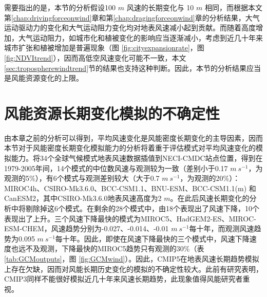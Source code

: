 需要指出的是，本节的分析假设100 $m$ 风速的长期变化与 10 $m$ 相同，而根据本文第\ref{chap:drivingforceonwind}章和第\ref{chap:dragingforceonwind}章的分析结果，大气运动驱动力的变化和大气运动阻力变化均对地表风速减小起到贡献。而随着高度增加，大气运动阻力，如城市化和植被变化的影响应当逐渐减小，考虑到近几十年来城市扩张和植被增加是普遍现象（图 \ref{fig:cityexpansionrate}，图 \ref{fig:NDVItrend}），因而高低空风速变化可能不一致，本文\ref{sec:tropospherewindtrend}节的结果也支持这种判断。因此，本节的分析结果应当是风能资源变化的上限。

\section{风能资源长期变化模拟的不确定性}

由本章之前的分析可以得到，平均风速变化是风能密度长期变化的主导因素，因而本节对于风能密度长期变化模拟能力的分析将着重于评估模式对平均风速变化的模拟能力。将34个全球气候模式地表风速数据插值到NECI-CMDC站点位置，得到在1979-2005年间，14个模式的中位数风速与观测较为一致（差别小于0.17 $m ~ s^{-1}$，为观测的5\%），有6个模式与观测差别较大（大于0.7 $m ~ s^{-1}$，为观测的20\%）：MIROC4h、CSIRO-Mk3.6.0、BCC-CSM1.1、BNU-ESM、BCC-CSM1.1(m) 和 CanESM2，其中CSIRO-Mk3.6.0地表风速高度为2 $m$。在此后风速长期变化的分析中将剔除掉这6个模式。在剩余的28个模式中，由18个表现出了风速下降，10个表现出了上升。三个风速下降最快的模式为MIROC5、HadGEM2-ES、MIROC-ESM-CHEM，风速趋势分别为-0.027、-0.014、-0.01 $m ~ s^{-1}$每十年，而观测风速趋势为0.095 $m ~ s^{-1}$每十年。因此，即使在风速下降最快的三个模式中，风速下降速度也远不及观测，下降最快的MIROC5趋势只有观测的30\%（表 \ref{tab:GCMoutputs}，图 \ref{fig:GCMwind}）。因此，CMIP5在地表风速长期趋势模拟上存在欠缺，因而对风能长期历史变化的模拟的不确定性较大。此前有研究表明，CMIP3同样不能很好模拟近几十年来风速长期趋势\citep{zongci2009evaluation}，此现象值得风能研究者重视。

